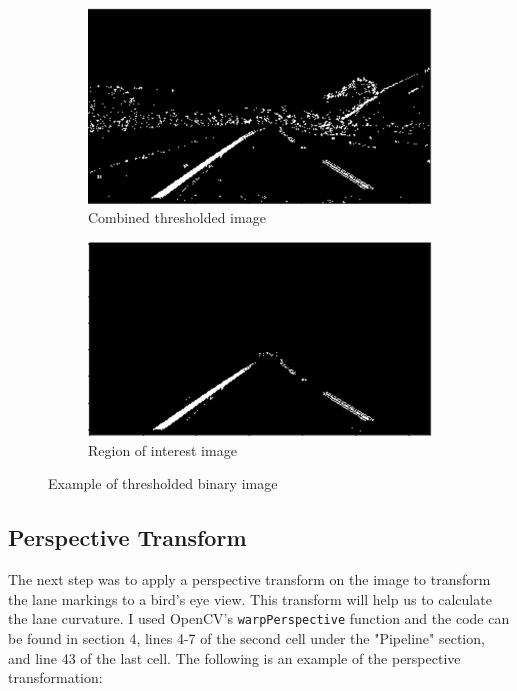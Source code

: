\documentclass[12pt]{article}
\begin{document}
\begin{figure}[h]
\centering
\begin{subfigure}{.5\textwidth}
  \centering
  \includegraphics[width=1\linewidth]{thresholded_test.png}
  \caption{Combined thresholded image}
\end{subfigure}%
\begin{subfigure}{.5\textwidth}
  \centering
  \includegraphics[width=1\linewidth]{roi_test.png}
  \caption{Region of interest image}
\end{subfigure}
\caption{Example of thresholded binary image}
\label{fig:threshold_img}
\end{figure}

\subsection{Perspective Transform}
The next step was to apply a perspective transform on the image to transform the lane markings to a bird's eye view. This transform will help us to calculate the lane curvature. I used OpenCV's \texttt{warpPerspective} function and the code can be found in section 4, lines 4-7 of the second cell under the "Pipeline" section, and line 43 of the last cell. The following is an example of the perspective transformation:
\end{document}
